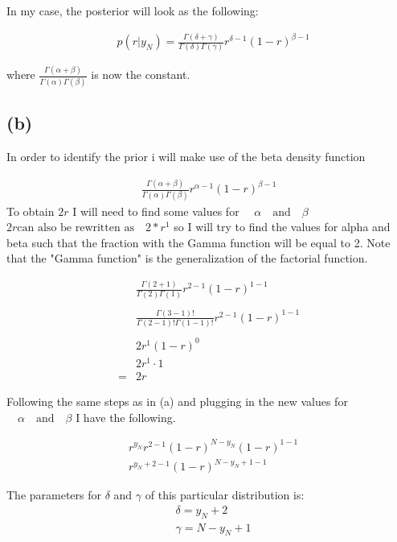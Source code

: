 In my case, the posterior will look as the following:

\begin{align*}
    & p(r|y_N) =  \frac{\Gamma (\delta + \gamma)}{\Gamma(\delta)\Gamma(\gamma)} r^{\delta - 1}(1 - r)^{\beta - 1}
\end{align*}

where $\frac{\Gamma (\alpha + \beta)}{\Gamma(\alpha)\Gamma(\beta)}$ is now the constant.

\subsection{(b)}
In order to identify the prior i will make use of the beta density function

\begin{align*}
    \frac{\Gamma (\alpha + \beta)}{\Gamma(\alpha)\Gamma(\beta)} r^{\alpha - 1}(1 - r)^{\beta - 1}
\end{align*}
To obtain $2r$ I will need to find some values for $\quad \alpha \quad \text{and} \quad \beta$
$2r \text{can also be rewritten as} \quad 2*r^1$ so I will try to find the values for alpha and beta
such that the fraction with the Gamma function will be equal to 2.
Note that the "Gamma function" is the generalization of the factorial function.

\begin{align*}
    & \frac{\Gamma (2 + 1)}{\Gamma(2)\Gamma(1)} r^{2 - 1}(1 - r)^{1 - 1} \\
    & \\
    & \frac{\Gamma (3 - 1)!}{\Gamma(2 - 1)!\Gamma(1 - 1)!} r^{2 - 1}(1 - r)^{1 - 1} \\
    & \\
    & 2r^{1}(1 - r)^{0} \\
    & 2r^{1} \cdot 1 \\
    = & 2r 
\end{align*}

Following the same steps as in (a) and plugging in the new values for $\quad \alpha \quad \text{and} \quad \beta$
I have the following.

\begin{align*}
    & r^{y_N} r^{2 - 1} (1-r)^{N - y_N} (1 - r)^{1 - 1} \\
    & r^{y_N + 2 - 1} (1 - r)^{N - y_N + 1 - 1} 
\end{align*}

The parameters for $\delta$ and $\gamma$ of this particular distribution is:
\begin{align*}
    & \delta = y_N + 2 \\
    & \gamma = N - y_N + 1 \\
\end{align*}

